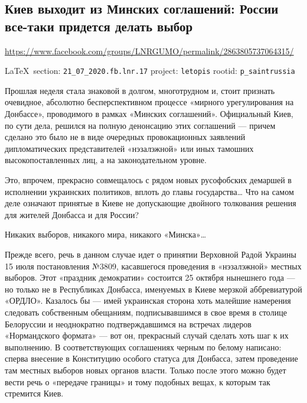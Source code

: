  
 
\subsection{Киев выходит из Минских соглашений: России все-таки придется делать выбор}
\label{sec:21_07_2020.fb.lnr.17}
\url{https://www.facebook.com/groups/LNRGUMO/permalink/2863805737064315/}
  
\vspace{0.5cm}
{\small\LaTeX~section: \verb|21_07_2020.fb.lnr.17| project: \verb|letopis| rootid: \verb|p_saintrussia|}
\vspace{0.5cm}


Прошлая неделя стала знаковой в долгом, многотрудном и, стоит признать
очевидное, абсолютно бесперспективном процессе «мирного урегулирования на
Донбассе», проводимого в рамках «Минских соглашений». Официальный Киев, по сути
дела, решился на полную денонсацию этих соглашений --- причем сделано это было не
в виде очередных провокационных заявлений дипломатических представителей
«нэзалэжной» или иных тамошних высокопоставленных лиц, а на законодательном
уровне.

Это, впрочем, прекрасно совмещалось с рядом новых русофобских демаршей в
исполнении украинских политиков, вплоть до главы государства… Что на самом деле
означают принятые в Киеве не допускающие двойного толкования решения для
жителей Донбасса и для России?

Никаких выборов, никакого мира, никакого «Минска»…

Прежде всего, речь в данном случае идет о принятии Верховной Радой Украины 15
июля постановления №3809, касавшегося проведения в «нэзалэжной» местных
выборов. Этот «праздник демократии» состоится 25 октября нынешнего года --- но
только не в Республиках Донбасса, именуемых в Киеве мерзкой аббревиатурой
«ОРДЛО». Казалось бы --- имей украинская сторона хоть малейшие намерения
следовать собственным обещаниям, подписывавшимся в свое время в столице
Белоруссии и неоднократно подтверждавшимся на встречах лидеров «Нормандского
формата» --- вот он, прекрасный случай сделать хоть шаг к их выполнению. В
соответствующих соглашениях черным по белому написано: сперва внесение в
Конституцию особого статуса для Донбасса, затем проведение там местных выборов
новых органов власти. Только после этого можно будет вести речь о «передаче
границы» и тому подобных вещах, к которым так стремится Киев.

